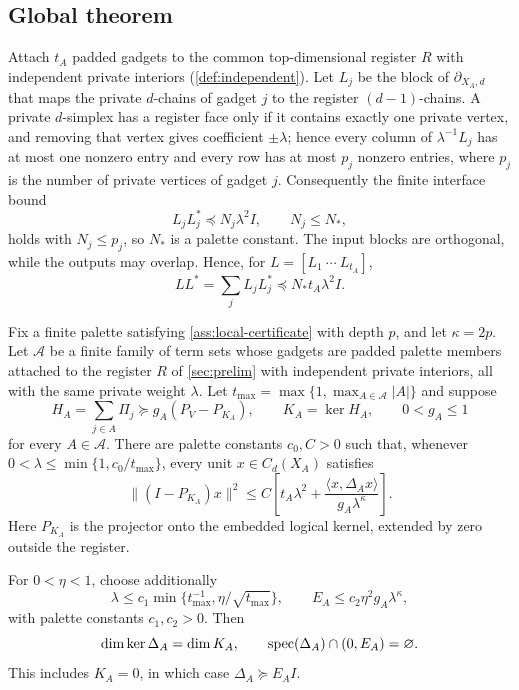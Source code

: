 \subsection{Global theorem}

Attach \(t_A\) padded gadgets to the common top-dimensional register \(R\)
with independent private interiors (\cref{def:independent}).  Let \(L_j\) be
the block of \(\partial_{X_A,d}\) that maps the private \(d\)-chains of
gadget \(j\) to the register \((d-1)\)-chains.  A private \(d\)-simplex has a
register face only if it contains exactly one private vertex, and removing
that vertex gives coefficient \(\pm\lambda\); hence every column of
\(\lambda^{-1}L_j\) has at most one nonzero entry and every row has at most
\(p_j\) nonzero entries, where \(p_j\) is the number of private vertices of
gadget \(j\).  Consequently the finite interface bound
\begin{equation}
\label{eq:interface}
L_jL_j^*\preceq N_j\lambda^2I,\qquad N_j\le N_*,
\end{equation}
holds with \(N_j\le p_j\), so \(N_*\) is a palette constant.
The input blocks are orthogonal, while the outputs may overlap.  Hence, for
\(L=[L_1\ \cdots\ L_{t_A}]\),
\[
LL^*=\sum_jL_jL_j^*\preceq N_*t_A\lambda^2I.
\]

\begin{theorem}
\label{thm:transfer}
Fix a finite palette satisfying \cref{ass:local-certificate} with depth
\(p\), and let \(\kappa=2p\).  Let
\(\mathcal A\) be a finite family of term sets whose gadgets are padded
palette members attached to the register \(R\) of \cref{sec:prelim} with
independent private interiors, all with the same private weight \(\lambda\).
Let \(t_{\max}=\max\{1,\max_{A\in\mathcal A}|A|\}\) and suppose
\[
H_A=\sum_{j\in A}\Pi_j\succeq
g_A(P_V-P_{K_A}),\qquad K_A=\ker H_A,\qquad 0<g_A\le1
\]
for every \(A\in\mathcal A\).
There are palette constants \(c_0,C>0\) such that, whenever
\(0<\lambda\le\min\{1,c_0/t_{\max}\}\), every unit \(x\in C_d(X_A)\)
satisfies
\begin{equation}
\label{eq:transfer-bound}
\boxed{\;
\|(I-P_{K_A})x\|^2
\le C\left[t_A\lambda^2+
\frac{\langle x,\Delta_Ax\rangle}{g_A\lambda^\kappa}\right].\;}
\end{equation}
Here \(P_{K_A}\) is the projector onto the embedded logical kernel, extended
by zero outside the register.

For \(0<\eta<1\), choose additionally
\begin{equation}
\label{eq:lambda-E-choice}
\lambda\le c_1\min\{t_{\max}^{-1},\eta/\sqrt{t_{\max}}\},
\qquad E_A\le c_2\eta^2g_A\lambda^\kappa,
\end{equation}
with palette constants \(c_1,c_2>0\).  Then
\begin{equation}
\label{eq:kernel-gap-conclusion}
\dim\ker\Delta_A=\dim K_A,\qquad
\operatorname{spec}(\Delta_A)\cap(0,E_A)=\varnothing .
\end{equation}
This includes \(K_A=0\), in which case \(\Delta_A\succeq E_AI\).
\end{theorem}

